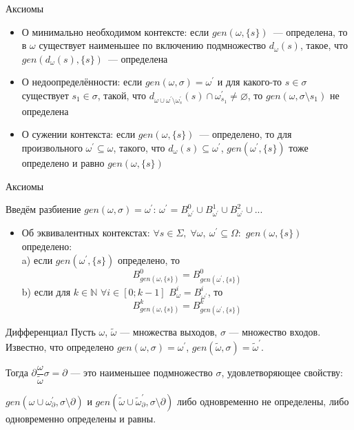 \begin{frame}{Аксиомы}
\begin{itemize}
	\item О минимально необходимом контексте: если $gen(\omega,\{s\})$~--- определена, то в $\omega$ существует наименьшее по включению подмножество $d_\omega(s)$, такое, что $gen(d_\omega(s), \{s\})$~--- определена
	
	\item О недоопределённости: если $gen(\omega, \sigma) = \omega^\prime$ и для какого-то $s\in\sigma$ существует $s_1\in\sigma$, такой, что $d_{\omega\cup\omega^\prime\setminus\omega^\prime_s}(s) \cap \omega^\prime_{s_1}\ne\varnothing$, то $gen(\omega, \sigma\setminus s_1)$ не определена
	
	\item О сужении контекста: если $gen(\omega,\{s\})$~--- определено, то для произвольного $\omega^\prime\subseteq\omega$, такого, что $d_\omega(s)\subseteq\omega^\prime$, $gen(\omega^\prime, \{s\})$ тоже определено и равно $gen(\omega,\{s\})$
\end{itemize}
\end{frame}

\begin{frame}{Аксиомы}

Введём разбиение $gen(\omega, \sigma) = \omega^\prime$: $\omega^\prime = B^0_{\omega^\prime} \cup B^1_{\omega^\prime} \cup B^2_{\omega^\prime} \cup ...$
	
\begin{itemize}
	\item Об эквивалентных контекстах: $\forall s \in \Sigma,\; \forall \omega,\: \omega^\prime \subseteq \Omega:$ $gen(\omega, \{s\})$ определено:\\
	a) если $gen(\omega^\prime, \{s\})$ определено, то $$B^0_{gen(\omega, \{s\})} = B^0_{gen(\omega^\prime, \{s\})}$$
	b) если для $k \in \mathbb{N}$ $\forall i \in [0; k-1]$ $B^i_{\omega} = B^i_{\omega^\prime}$, то $$B^k_{gen(\omega, \{s\})} = B^k_{gen(\omega^\prime, \{s\})}$$
\end{itemize}
\end{frame}

\begin{frame}{Дифференциал}
Пусть $\omega$, $\tilde{\omega}$ --- множества выходов, $\sigma$ --- множество входов. Известно, что определено $gen(\omega, \sigma) = \omega^\prime$, $gen(\tilde{\omega}, \sigma) = \tilde{\omega}^\prime$.

Тогда $\partial\dfrac{\omega}{\tilde{\omega}}\sigma = \partial$ --- это наименьшее подмножество $\sigma$, удовлетворяющее свойству: 

$gen(\omega \cup \omega^\prime_{\partial}, \sigma\setminus\partial)$ и
$gen(\tilde{\omega} \cup \tilde{\omega}^\prime_{\partial}, \sigma\setminus\partial)$ либо одновременно не определены, либо одновременно определены и равны. 
\end{frame}

